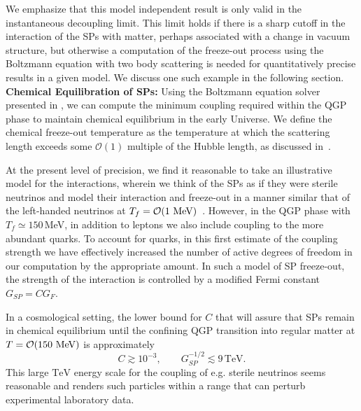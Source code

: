 We emphasize that this model independent result is only valid in the instantaneous decoupling limit.  This limit holds if there is a sharp cutoff in the interaction of the SPs with matter, perhaps associated with a change in vacuum structure, but otherwise a computation of the freeze-out process using the Boltzmann equation with two body scattering is needed for quantitatively precise results in a given model.  We discuss one such example in the following section.\\[-0.2cm]


{\bf Chemical Equilibration of SPs:}
Using the Boltzmann equation solver presented in \cite{Birrell:2014uka}, we can compute the minimum coupling required within the QGP phase to maintain chemical equilibrium in the early Universe.  We define the chemical freeze-out temperature as the temperature at which the scattering length exceeds some $\mathcal{O}(1)$ multiple of the Hubble length, as discussed in~\cite{Birrell:2014uka}.   

At the present level of precision, we find it reasonable to take an illustrative model for the interactions, wherein we think of the SPs as if they were sterile neutrinos and model their  interaction and  freeze-out in a manner similar that of the left-handed neutrinos at $T_f=\mathcal{O}(1\text{ MeV})$~\cite{Mangano2005}.  However, in the QGP phase with $T_f\simeq 150$\,MeV, in addition to leptons we also include  coupling to the more abundant quarks. To account for quarks, in this first estimate of the coupling strength we have effectively increased  the number of active degrees of freedom in our computation by the appropriate amount.  In such a model of SP freeze-out, the strength of the interaction is controlled by a modified Fermi constant $  G_{SP}=C G_F$. 


In a cosmological setting, the lower bound for $C$ that will assure that SPs remain in chemical equilibrium until the confining QGP transition into regular matter at $T=\mathcal{O}(150\text{ MeV})$ is approximately
\begin{equation}
C\gtrsim 10^{-3}, \qquad   G_{SP}^{-1/2}\lesssim 9\,\mathrm{TeV}.
\end{equation}
This large $\mathrm{TeV}$  energy scale  for the coupling of e.g. sterile neutrinos seems reasonable and renders such particles within a range that can perturb experimental laboratory data. 

